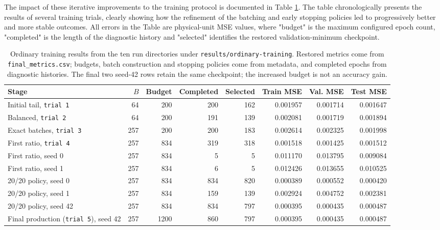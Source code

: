 The impact of these iterative improvements to the training protocol is documented in Table \ref{tab:04_final_training_trials}. The table chronologically presents the results of several training trials, clearly showing how the refinement of the batching and early stopping policies led to progressively better and more stable outcomes. All errors in the Table are physical-unit MSE values, where "budget" is the maximum configured epoch count, "completed" is the length of the diagnostic history and "selected" identifies the restored validation-minimum checkpoint.\\

\begin{table}[h!]
    \centering
    \begin{tabularx}{\linewidth}{@{}Xrrrrrrr@{}}
        \hline
        Stage & $B$ & Budget & Completed & Selected & Train MSE & Val. MSE & Test MSE \\
        \hline
        Initial tail, \texttt{trial 1} & 64 & 200 & 200 & 162 & 0.001957 & 0.001714 & 0.001647 \\
        Balanced, \texttt{trial 2} & 64 & 200 & 191 & 139 & 0.002081 & 0.001719 & 0.001894 \\
        Exact batches, \texttt{trial 3} & 257 & 200 & 200 & 183 & 0.002614 & 0.002325 & 0.001998 \\
        First ratio, \texttt{trial 4} & 257 & 834 & 319 & 318 & 0.001518 & 0.001425 & 0.001512 \\
        First ratio, seed 0 & 257 & 834 & 5 & 5 & 0.011170 & 0.013795 & 0.009084 \\
        First ratio, seed 1 & 257 & 834 & 6 & 5 & 0.012426 & 0.013655 & 0.010525 \\
        20/20 policy, seed 0 & 257 & 834 & 834 & 820 & 0.000389 & 0.000552 & 0.000420 \\
        20/20 policy, seed 1 & 257 & 834 & 159 & 139 & 0.002924 & 0.004752 & 0.002381 \\
        20/20 policy, seed 42 & 257 & 834 & 834 & 797 & 0.000395 & 0.000435 & 0.000487 \\
        Final production (\texttt{trial 5}), seed 42 & 257 & 1200 & 860 & 797 & 0.000395 & 0.000435 & 0.000487 \\
        \hline
    \end{tabularx}
    \caption{Ordinary training results from the ten run directories under \texttt{results/ordinary-training}. Restored metrics come from \texttt{final\_metrics.csv}; budgets, batch construction and stopping policies come from metadata, and completed epochs from diagnostic histories. The final two seed-42 rows retain the same checkpoint; the increased budget is not an accuracy gain.}
    \label{tab:04_final_training_trials}
\end{table}

